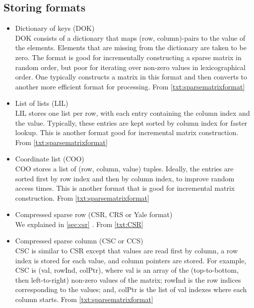 \subsection{Storing formats}
\begin{itemize}
	\item Dictionary of keys (DOK)\\
		DOK consists of a dictionary that maps (row, column)-pairs to the value of the elements. Elements that are missing from the dictionary are taken to be zero. The format is good for incrementally constructing a sparse matrix in random order, but poor for iterating over non-zero values in lexicographical order. One typically constructs a matrix in this format and then converts to another more efficient format for processing. From \ref{txt:sparsematrixformat}
	\item List of lists (LIL)\\
	LIL stores one list per row, with each entry containing the column index and the value. Typically, these entries are kept sorted by column index for faster lookup. This is another format good for incremental matrix construction. From \ref{txt:sparsematrixformat}
	\item Coordinate list (COO)\\
	COO stores a list of (row, column, value) tuples. Ideally, the entries are sorted first by row index and then by column index, to improve random access times. This is another format that is good for incremental matrix construction. From \ref{txt:sparsematrixformat}
	\item Compressed sparse row (CSR, CRS or Yale format)\\
	 We explained in \ref{sec:csr} . From \ref{txt:CSR}
	\item Compressed sparse column (CSC or CCS)\\
	CSC is similar to CSR except that values are read first by column, a row index is stored for each value, and column pointers are stored. For example, CSC is (val, rowInd, colPtr), where val is an array of the (top-to-bottom, then left-to-right) non-zero values of the matrix; rowInd is the row indices corresponding to the values; and, colPtr is the list of val indexes where each column starts. From \ref{txt:sparsematrixformat}
\end{itemize}

